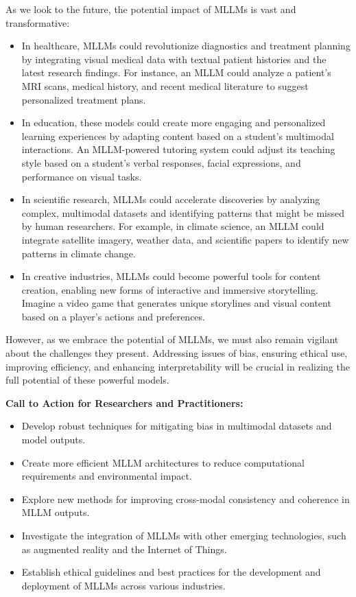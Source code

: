 As we look to the future, the potential impact of MLLMs is vast and transformative:

\begin{itemize}
    \item In healthcare, MLLMs could revolutionize diagnostics and treatment planning by integrating visual medical data with textual patient histories and the latest research findings. For instance, an MLLM could analyze a patient's MRI scans, medical history, and recent medical literature to suggest personalized treatment plans.
    
    \item In education, these models could create more engaging and personalized learning experiences by adapting content based on a student's multimodal interactions. An MLLM-powered tutoring system could adjust its teaching style based on a student's verbal responses, facial expressions, and performance on visual tasks.
    
    \item In scientific research, MLLMs could accelerate discoveries by analyzing complex, multimodal datasets and identifying patterns that might be missed by human researchers. For example, in climate science, an MLLM could integrate satellite imagery, weather data, and scientific papers to identify new patterns in climate change.
    
    \item In creative industries, MLLMs could become powerful tools for content creation, enabling new forms of interactive and immersive storytelling. Imagine a video game that generates unique storylines and visual content based on a player's actions and preferences.
\end{itemize}

However, as we embrace the potential of MLLMs, we must also remain vigilant about the challenges they present. Addressing issues of bias, ensuring ethical use, improving efficiency, and enhancing interpretability will be crucial in realizing the full potential of these powerful models.

\textbf{Call to Action for Researchers and Practitioners:}
\begin{itemize}
    \item Develop robust techniques for mitigating bias in multimodal datasets and model outputs.
    \item Create more efficient MLLM architectures to reduce computational requirements and environmental impact.
    \item Explore new methods for improving cross-modal consistency and coherence in MLLM outputs.
    \item Investigate the integration of MLLMs with other emerging technologies, such as augmented reality and the Internet of Things.
    \item Establish ethical guidelines and best practices for the development and deployment of MLLMs across various industries.
\end{itemize}

